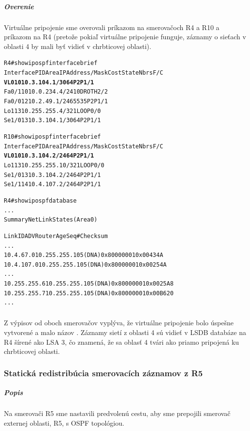 \documentclass[12pt,twoside,a4paper]{article}
\begin{document}
\subparagraph{Overenie}
\subparagraph{}
Virtuálne pripojenie sme overovali príkazom  na smerovačoch R4 a R10 a príkazom  na R4 (pretože pokiaľ virtuálne pripojenie funguje, záznamy o sieťach v oblasti 4 by mali byť vidieť v chrbticovej oblasti).

\noindent
{\selectfont
\begin{small}
\begin{alltt}
R4#show ip ospf interface brief 
Interface    PID   Area            IP Address/Mask    Cost  State Nbrs F/C
\textbf{VL0          1     0               10.3.104.1/30      64    P2P   1/1}
Fa0/1        1     0               10.0.234.4/24      10    DROTH 2/2
Fa0/0        1     2               10.2.49.1/24       65535 P2P   1/1
Lo1          1     3               10.255.255.4/32    1     LOOP  0/0
Se1/0        1     3               10.3.104.1/30      64    P2P   1/1


R10#show ip ospf interface brief 
Interface    PID   Area            IP Address/Mask    Cost  State Nbrs F/C
\textbf{VL0          1     0               10.3.104.2/24      64    P2P   1/1}
Lo1          1     3               10.255.255.10/32   1     LOOP  0/0
Se1/0        1     3               10.3.104.2/24      64    P2P   1/1
Se1/1        1     4               10.4.107.2/24      64    P2P   1/1



R4#show ip ospf database 
...
		Summary Net Link States (Area 0)

Link ID         ADV Router      Age         Seq#       Checksum
...
10.4.67.0       10.255.255.10   5     (DNA) 0x80000001 0x00434A
10.4.107.0      10.255.255.10   5     (DNA) 0x80000001 0x00254A
...
10.255.255.6    10.255.255.10   5     (DNA) 0x80000001 0x0025A8
10.255.255.7    10.255.255.10   5     (DNA) 0x80000001 0x00B620
...
\end{alltt}
\end{small}
}

\subparagraph{}
Z výpisov od oboch smerovačov vyplýva, že virtuálne pripojenie bolo úspešne vytvorené a malo názov . Záznamy sietí z oblasti 4 sú vidieť v LSDB databáze na R4 šírené ako LSA 3, čo znamená, že sa oblasť 4 tvári ako priamo pripojená ku chrbticovej oblasti.

\subsubsection*{Statická redistribúcia smerovacích záznamov z R5}
\subparagraph{Popis}
\subparagraph{}
Na smerovači R5 sme nastavili predvolenú cestu, aby sme prepojili smerovač externej oblasti, R5, s OSPF topológiou.
\end{document}
